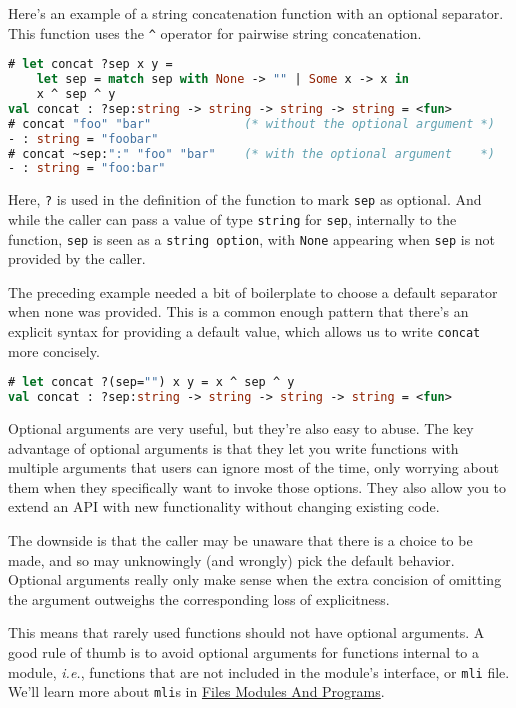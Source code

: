 Here's an example of a string concatenation function with an optional
separator. This function uses the \passthrough{\lstinline!^!} operator
for pairwise string concatenation.

\begin{lstlisting}[language=Caml]
# let concat ?sep x y =
    let sep = match sep with None -> "" | Some x -> x in
    x ^ sep ^ y
val concat : ?sep:string -> string -> string -> string = <fun>
# concat "foo" "bar"             (* without the optional argument *)
- : string = "foobar"
# concat ~sep:":" "foo" "bar"    (* with the optional argument    *)
- : string = "foo:bar"
\end{lstlisting}

Here, \passthrough{\lstinline!?!} is used in the definition of the
function to mark \passthrough{\lstinline!sep!} as optional. And while
the caller can pass a value of type \passthrough{\lstinline!string!} for
\passthrough{\lstinline!sep!}, internally to the function,
\passthrough{\lstinline!sep!} is seen as a
\passthrough{\lstinline!string option!}, with
\passthrough{\lstinline!None!} appearing when
\passthrough{\lstinline!sep!} is not provided by the caller.

The preceding example needed a bit of boilerplate to choose a default
separator when none was provided. This is a common enough pattern that
there's an explicit syntax for providing a default value, which allows
us to write \passthrough{\lstinline!concat!} more concisely.

\begin{lstlisting}[language=Caml]
# let concat ?(sep="") x y = x ^ sep ^ y
val concat : ?sep:string -> string -> string -> string = <fun>
\end{lstlisting}

Optional arguments are very useful, but they're also easy to abuse. The
key advantage of optional arguments is that they let you write functions
with multiple arguments that users can ignore most of the time, only
worrying about them when they specifically want to invoke those options.
They also allow you to extend an API with new functionality without
changing existing code.

The downside is that the caller may be unaware that there is a choice to
be made, and so may unknowingly (and wrongly) pick the default behavior.
Optional arguments really only make sense when the extra concision of
omitting the argument outweighs the corresponding loss of explicitness.

This means that rarely used functions should not have optional
arguments. A good rule of thumb is to avoid optional arguments for
functions internal to a module, \emph{i.e.}, functions that are not
included in the module's interface, or \passthrough{\lstinline!mli!}
file. We'll learn more about \passthrough{\lstinline!mli!}s in
\href{files-modules-and-programs.html\#files-modules-and-programs}{Files
Modules And Programs}.

